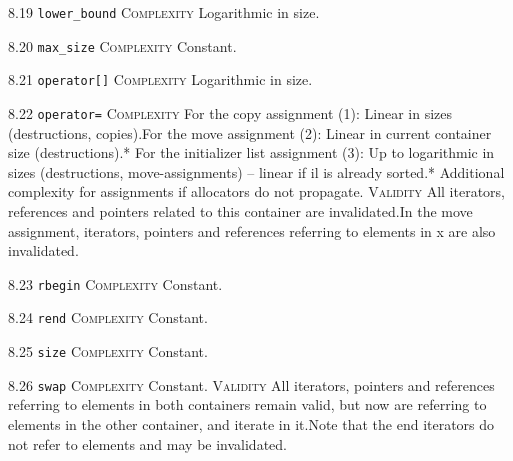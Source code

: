 \noindent\textcolor{clime}{8.19 \texttt{lower\_bound}} \textsc{Complexity} Logarithmic in size. \vspace{0.5em}

\noindent\textcolor{cgreen}{8.20 \texttt{max\_size}} \textsc{Complexity} Constant. \vspace{0.5em}

\noindent\textcolor{clime}{8.21 \texttt{operator[]}} \textsc{Complexity} Logarithmic in size. \vspace{0.5em}

\noindent\textcolor{corange}{8.22 \texttt{operator=}} \textsc{Complexity} For the copy assignment (1): Linear in sizes (destructions, copies).For the move assignment (2): Linear in current container size (destructions).* For the initializer list assignment (3): Up to logarithmic in sizes (destructions, move-assignments) -- linear if il is already sorted.* Additional complexity for assignments if allocators do not propagate. \textsc{Validity} All iterators, references and pointers related to this container are invalidated.In the move assignment, iterators, pointers and references referring to elements in x are also invalidated.\vspace{0.5em}

\noindent\textcolor{cgreen}{8.23 \texttt{rbegin}} \textsc{Complexity} Constant. \vspace{0.5em}

\noindent\textcolor{cgreen}{8.24 \texttt{rend}} \textsc{Complexity} Constant. \vspace{0.5em}

\noindent\textcolor{cgreen}{8.25 \texttt{size}} \textsc{Complexity} Constant. \vspace{0.5em}

\noindent\textcolor{cgreen}{8.26 \texttt{swap}} \textsc{Complexity} Constant. \textsc{Validity} All iterators, pointers and references referring to elements in both containers remain valid, but now are referring to elements in the other container, and iterate in it.Note that the end iterators do not refer to elements and may be invalidated.\vspace{0.5em}

